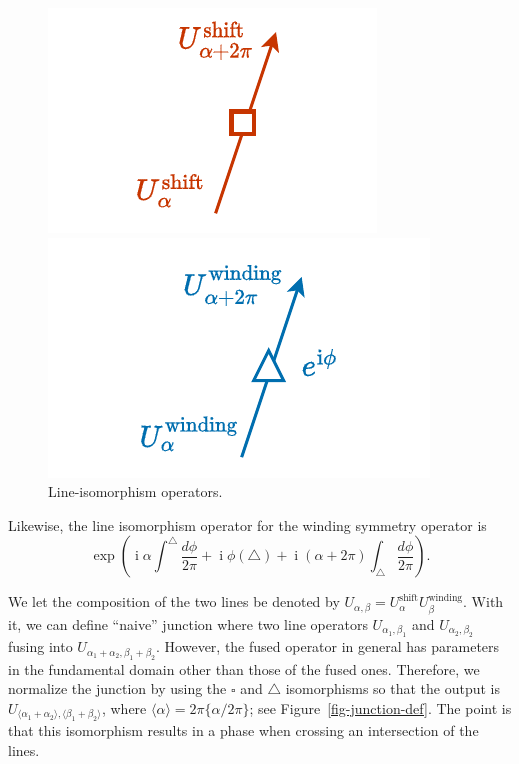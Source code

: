 \documentclass[11pt,toc=bibliography]{scrbook}
\DeclareMathOperator{\imunit}{i}
\numberwithin{equation}{section}
\DeclareMathOperator{\imunit}{i}
\begin{document}
\begin{figure}[t]

\begin{minipage}{0.50\linewidth}
\begin{center}
\includegraphics{figures/shift_2pi_isom.pdf}
\end{center}
\end{minipage}%
%
\begin{minipage}{0.50\linewidth}
\begin{center}
\includegraphics{figures/winding_2pi_isom.pdf}
\end{center}
\end{minipage}%

\caption{\label{fig-line-isom}Line-isomorphism operators.}

\end{figure}%

Likewise, the line isomorphism operator for the winding symmetry
operator is \[
 \exp\left(\imunit \alpha \int^{\triangle} \frac{d\phi}{2\pi} + \imunit\phi(\triangle)  + \imunit (\alpha+2\pi)  \int_{\triangle} \frac{d\phi}{2\pi}  \right).
\]

We let the composition of the two lines be denoted by
\(U_{\alpha,\beta} = U^\text{shift}_\alpha U^\text{winding}_\beta\).
With it, we can define ``naive'' junction where two line operators
\(U_{\alpha_1,\beta_1}\) and \(U_{\alpha_2,\beta_2}\) fusing into
\(U_{\alpha_1+\alpha_2,\beta_1+\beta_2}\). However, the fused operator
in general has parameters in the fundamental domain other than those of
the fused ones. Therefore, we normalize the junction by using the
\(\square\) and \(\triangle\) isomorphisms so that the output is
\(U_{\langle \alpha_1+\alpha_2\rangle, \langle \beta_1+\beta_2\rangle}\),
where \(\langle \alpha \rangle = 2\pi\{\alpha/2\pi\}\); see
Figure~\ref{fig-junction-def}. The point is that this isomorphism
results in a phase when crossing an intersection of the lines.
\end{document}
